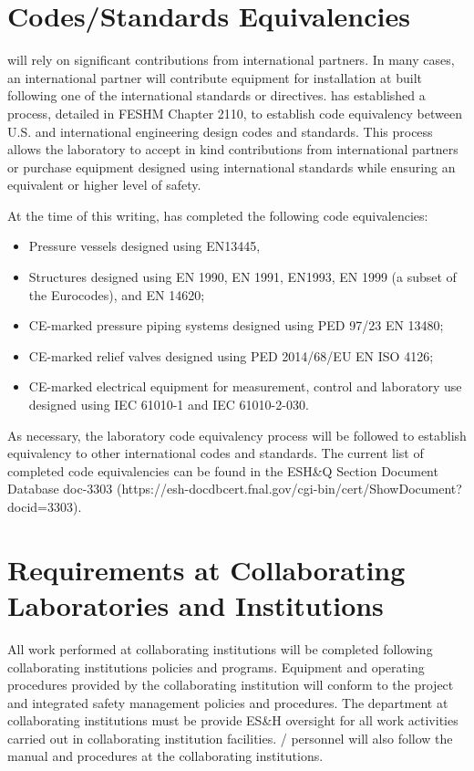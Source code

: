 \section{Codes/Standards Equivalencies}
\label{sec:esh_codes}

 will rely on significant contributions from international
partners. In many cases, an international partner will contribute
equipment for installation at \fnal built following one of the
international standards or directives. \fnal has established a
process, detailed in FESHM Chapter 2110, to establish code equivalency
between U.S. and international engineering design codes and
standards. This process allows the laboratory to accept in kind
contributions from international partners or purchase equipment
designed using international standards while ensuring an equivalent or
higher level of safety.

At the time of this writing, \fnal has completed the following code
equivalencies:
\begin{itemize}
 \item Pressure vessels designed using EN13445,
 \item Structures designed using EN 1990, EN 1991, EN1993, EN 1999 (a
   subset of the Eurocodes), and EN 14620;
 \item CE-marked pressure piping systems designed using PED 97/23 EN 13480;
 \item CE-marked relief valves designed using PED 2014/68/EU EN ISO 4126;
 \item CE-marked electrical equipment for measurement, control and
   laboratory use designed using IEC 61010-1 and IEC 61010-2-030.
\end{itemize}

As necessary, the laboratory code equivalency process will be followed
to establish equivalency to other international codes and
standards. The current list of completed code equivalencies can be
found in the ESH\&Q Section Document Database doc-3303
(https://esh-docdbcert.fnal.gov/cgi-bin/cert/ShowDocument?docid=3303).

\section{ Requirements at Collaborating Laboratories and Institutions}

All work performed at collaborating institutions will be completed following collaborating institutions 
policies and programs. Equipment and operating procedures
provided by the collaborating institution will conform to the 
project  and integrated safety management policies and
procedures. The  department at collaborating institutions must be
provide ES\&H oversight for all work activities
carried out in collaborating institution facilities. /
personnel will also follow the  manual and procedures at the
collaborating institutions.
